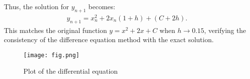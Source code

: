 \documentclass[journal]{IEEEtran}
\begin{document}
Thus, the solution for $ y_{n+1} $ becomes:
\begin{align}
y_{n+1} = x_n^2 + 2x_n(1 + h) + (C + 2h).
\end{align}
This matches the original function $y = x^2 + 2x + C$ when $h \to 0.15$, verifying the consistency of the difference equation method with the exact solution.
\begin{figure}[h]
    \centering
    \texttt{[image: fig.png]}
    \caption{Plot of the differential equation}
    \label{fig:Plot}
    \end{figure}
\end{document}
